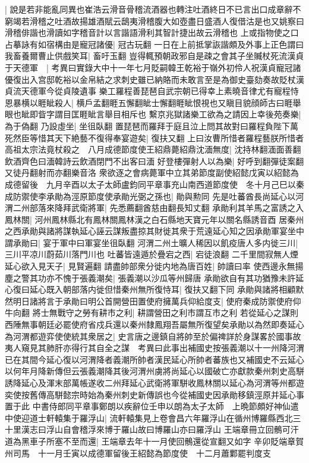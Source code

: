 |{
	說是若非能亂同異也崔浩云滑音骨稽流酒器也轉注吐酒終日不已言出口成章辭不窮竭若滑稽之吐酒故揚雄酒賦云鴟夷滑稽腹大如壺盡日盛酒人復借沽是也又姚察曰滑稽俳諧也滑讀如字稽音計以言諧語滑利其智計捷出故云滑稽也}
上或指物使之口占摹詠有如宿構由是寵冠諸優|{
	冠古玩翻}
一日在上前抵掌詼諧頗及外事上正色謂曰我畜養爾曹止供戲笑耳|{
	畜吁玉翻}
豈得輒預朝政邪自是疎之會其子坐贓杖死流漢貞于天德軍　|{
	考異曰實錄大中十一年七月貶嗣韓王乾裕于嶺外初伶人祝漢貞寵冠諸優復出入宫邸乾裕以金帛結之求刺史雖已納賂而未敢言至是為御史臺劾奏故貶杖漢貞流天德軍今從貞陵遺事}
樂工羅程善琵琶自武宗朝已得幸上素曉音律尤有寵程恃恩暴横以睚眦殺人|{
	横戶孟翻睚五懈翻眦士懈翻睚眦恨視也又瞋目貌顔師古曰睚舉眼也眦即眥字謂目匡睚眦言舉目相斥也}
繫京兆獄諸樂工欲為之請因上幸後苑奏樂|{
	為于偽翻}
乃設虛坐|{
	坐徂臥翻}
置琵琶而羅拜于庭且泣上問其故對曰羅程負陛下萬死然臣等惜其天下絶藝不復得奉宴遊矣|{
	復扶又翻}
上曰汝曹所惜者羅程藝朕所惜者高祖太宗法竟杖殺之　八月成德節度使王紹鼎薨紹鼎沈湎無度|{
	沈持林翻湎面善翻飲酒齊色曰湎韓詩云飲酒閉門不出客曰湎}
好登樓彈射人以為樂|{
	好呼到翻彈徒案翻又徒丹翻射而亦翻樂音洛}
衆欲逐之會病薨軍中立其弟節度副使紹懿戊寅以紹懿為成德留後　九月辛酉以太子太師盧鈞同平章事充山南西道節度使　冬十月己巳以秦成防禦使李承勛為涇原節度使承勛光弼之孫也|{
	勛與勲同}
先是吐蕃酋長尚延心以河渭二州部落來降拜武衛將軍|{
	先悉薦翻酋慈由翻長知丈翻}
承勛利其羊馬之富誘之入鳳林關|{
	河州鳳林縣北有鳳林關鳳林漢之白石縣地天寶元年以關名縣誘音酉}
居秦州之西承勛與諸將謀執延心誣云謀叛盡掠其財徙其衆于荒遠延心知之因承勛軍宴坐中謂承勛曰|{
	宴于軍中曰軍宴坐徂臥翻}
河渭二州土曠人稀因以飢疫唐人多内徙三川|{
	三川平凉川蔚茹川落門川也}
吐蕃皆遠遁於疊宕之西|{
	宕徒浪翻}
二千里間寂無人煙延心欲入見天子|{
	見賢遍翻}
請盡帥部衆分徙内地為唐百姓|{
	帥讀曰率}
使西邊永無揚塵之警其功亦不愧于張義潮矣|{
	張義潮以沙瓜等州歸唐}
承勛欲自有其功猶豫未許延心復曰延心既入朝部落内徙但惜秦州無所復恃耳|{
	復扶又翻下同}
承勛與諸將相顧默然明日諸將言于承勛曰明公首開營田置使府擁萬兵仰給度支|{
	使府秦成防禦使府仰牛向翻}
將士無戰守之勞有耕市之利|{
	耕謂營田之利市謂互市之利}
若從延心之謀則西陲無事朝廷必罷使府省戍兵還以秦州隸鳳翔吾屬無所復望矣承勛以為然即奏延心為河渭都遊弈使使統其衆居之|{
	史言唐之邊鎮自將帥至於偏禆詳於身謀畧於國事故夷人窺見其肺肝亦得行其自全之謀　考異曰此事出補國史按張義潮以十一州降河渭已在其間今延心復以河渭降者義潮所帥者漢民延心所帥者蕃族也又補國史不云延心以何年月降新傳但云張義潮降其後河渭州虜將尚延心以國破亡亦獻款秦州刺史高駢誘降延心及渾末部萬帳遂收二州拜延心武衛將軍駢收鳳林關以延心為河渭等州都遊奕使按舊傳高駢懿宗時始為秦州刺史新傳誤也今從補國史因承勛移鎮涇原并延心事置于此}
中書侍郎同平章事鄭朗以疾辭位壬申以朗為太子太師　上晩節頗好神仙遣中使迎道士軒轅集于羅浮山|{
	流軒轅集見上卷會昌六年羅浮山在循州博羅縣西北三十里漢志曰浮山自會稽浮來博于羅山故曰博羅山亦曰羅浮山}
王端章冊立回鶻可汗道為黑車子所塞不至而還|{
	王端章去年十一月使回鶻還從宣翻又如字}
辛卯貶端章賀州司馬　十一月壬寅以成德軍留後王紹懿為節度使　十二月蕭鄴罷判度支

